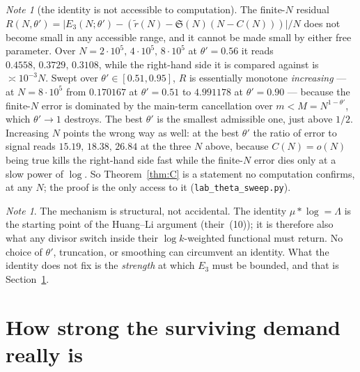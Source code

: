 \documentclass[11pt,a4paper]{article}
\theoremstyle{plain}
\theoremstyle{definition}
\theoremstyle{remark}
\newtheorem{note}[theorem]{Note}
\renewcommand{\SS}{\mathfrak{S}}
\begin{document}
\begin{note}[the identity is not accessible to computation]%
\label{note:thetasweep}
The finite-$N$ residual
$R(N,\theta')=\bigl|E_3(N;\theta')-(\tilde r(N)-\SS(N)(N-C(N)))\bigr|/N$
does not become small in any accessible range, and it cannot be made
small by either free parameter. Over
$N=2\cdot10^5,\,4\cdot10^5,\,8\cdot10^5$ at $\theta'=0.56$ it reads
$0.4558,\,0.3729,\,0.3108$, while the right-hand side it is compared
against is $\asymp10^{-3}N$. Swept over $\theta'\in[0.51,0.95]$, $R$
is essentially monotone \emph{increasing} --- at $N=8\cdot10^5$ from
$0.170167$ at $\theta'=0.51$ to $4.991178$ at $\theta'=0.90$ ---
because the finite-$N$ error is dominated by the main-term
cancellation over $m<M=N^{1-\theta'}$, which $\theta'\to1$ destroys.
The best $\theta'$ is the smallest admissible one, just above $1/2$.
Increasing $N$ points the wrong way as well: at the best $\theta'$ the
ratio of error to signal reads $15.19,\,18.38,\,26.84$ at the three
$N$ above, because $C(N)=o(N)$ being true kills the right-hand side
fast while the finite-$N$ error dies only at a slow power of $\log$.
So Theorem~\ref{thm:C} is a statement no computation confirms, at any
$N$; the proof is the only access to it
(\texttt{lab\_theta\_sweep.py}).
\end{note}

\begin{note}
The mechanism is structural, not accidental. The identity
$\mu*\log=\Lambda$ is the starting point of the Huang--Li argument
(their~(10)); it is therefore also what any divisor switch inside
their $\log k$-weighted functional must return. No choice of
$\theta'$, truncation, or smoothing can circumvent an identity. What
the identity does not fix is the \emph{strength} at which $E_3$ must
be bounded, and that is Section~\ref{sec:strength}.
\end{note}

\section{How strong the surviving demand really is}\label{sec:strength}
\end{document}
